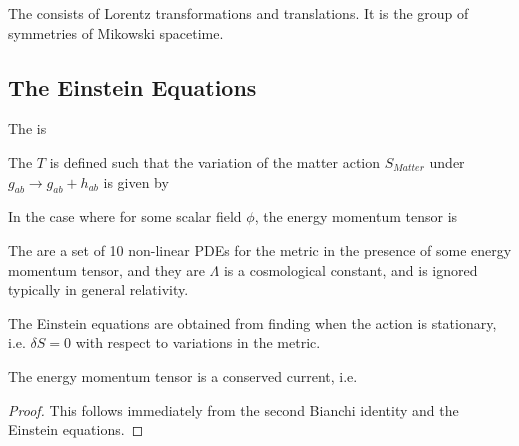 \documentclass{article}
\begin{document}
\begin{definition}
The  consists of Lorentz transformations and translations. It is the group of symmetries of Mikowski spacetime. 
\end{definition}

\subsection{The Einstein Equations}

\begin{definition}
The  is 
\end{definition}


\begin{definition}
The  $T$ is defined such that the variation of the matter action $S_{Matter}$ under $g_{ab} \to g_{ab} + h_{ab}$ is given by 
\end{definition}

\begin{example}
In the case where 
for some scalar field $\phi$, the energy momentum tensor is 
\end{example}

\begin{definition}
The  are a set of 10 non-linear PDEs for the metric in the presence of some energy momentum tensor, and they are 
$\Lambda$ is a cosmological constant, and is ignored typically in general relativity. 
\end{definition}

\begin{theorem}
The Einstein equations are obtained from finding when the action 
is stationary, i.e. $\delta S = 0$ with respect to variations in the metric. 
\end{theorem}

\begin{lemma}
The energy momentum tensor is a conserved current, i.e. 
\end{lemma}
\begin{proof}
This follows immediately from the second Bianchi identity and the Einstein equations. 
\end{proof}
\end{document}
